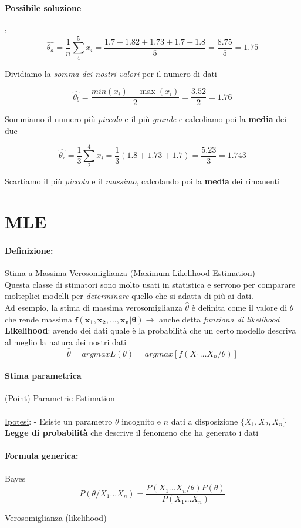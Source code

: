 \documentclass[]{article}
\newcommand{\definizione}{\paragraph{Definizione:}}
\newcommand{\formula}{\paragraph{Formula generica:}}
\begin{document}
    \paragraph{Possibile soluzione}: 
    \[ \hat{\theta_a} = \frac{1}{n} \sum_{4}^{5} x_i = \frac{1.7 + 1.82 + 1.73 + 1.7 + 1.8}{5} = \frac{8.75}{5} = 1.75 \]
    \centerline{Dividiamo la \textit{somma dei nostri valori} per il numero di dati}
    \[ \hat{\theta_b} = \frac{min(x_i) + \max(x_i)}{2} = \frac{3.52}{2} = 1.76 \]
    \centerline{Sommiamo il numero più \textit{piccolo} e il più \textit{grande} e calcoliamo poi la \textbf{media} dei due}
    \[ \hat{\theta_c} = \frac{1}{3} \sum_{2}^{4} x_i = \frac{1}{3} (1.8 + 1.73 + 1.7) = \frac{5.23}{3} = 1.743 \]
    \centerline{Scartiamo il più \textit{piccolo} e il \textit{massimo}, calcolando poi la \textbf{media} dei rimanenti}
    \newpage
    \section{MLE}
    \definizione Stima a Massima Verosomiglianza (Maximum Likelihood Estimation) \\
    Questa classe di stimatori sono molto usati in statistica e servono per comparare molteplici modelli per \textit{determinare} quello che si adatta di più ai dati. \\
    Ad esempio, la stima di massima verosomiglianza $\hat{\theta}$ è definita come il valore di $\theta$ che rende massima $\boldsymbol{f(x_1, x_2, \ldots, x_n \rvert \theta)} \rightarrow$ anche detta \textit{funziona di likelihood} \\[2ex]
    \textbf{Likelihood}: avendo dei dati quale è la probabilità che un certo modello descriva al meglio la natura dei nostri dati
    \[ \hat{\theta} = argmax L(\theta) = argmax[f(X_1 \ldots X_n / \theta )] \]
    \paragraph{Stima parametrica}(Point) Parametric Estimation \\ \\
    \underline{Ipotesi}:
    - Esiste un parametro $\theta$ incognito e $n$ dati a disposizione $\{X_1, X_2, X_n\}$ \\
    \textbf{Legge di probabilità} che descrive il fenomeno che ha generato i dati
    \formula Bayes
    \[ P(\theta / X_1 \ldots X_n) = \frac{P(X_1 \ldots X_n / \theta) P(\theta)}{P(X_1 \ldots X_n)} \]
    \centerline{Verosomiglianza (likelihood)}
\end{document}
